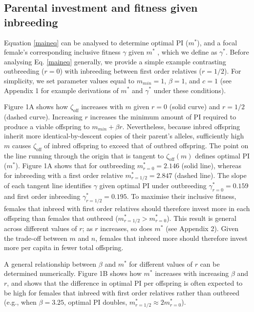\documentclass[12pt]{article}
\begin{document}
\subsection*{Parental investment and fitness given inbreeding}

Equation \ref{maineq} can be analysed to determine optimal PI ($m^{*}$), and a focal female's corresponding inclusive fitness $\gamma$ given $m^{*}$ \cite[][]{Kuijper2012}, which we define as $\gamma^{*}$. Before analysing Eq. \ref{maineq} generally, we provide a simple example contrasting outbreeding ($r=0$) with inbreeding between first order relatives ($r=1/2$). For simplicity, we set parameter values equal to $m_{min}=1$, $\beta=1$, and $c=1$ (see Appendix 1 for example derivations of $m^{*}$ and $\gamma^{*}$ under these conditions).

Figure 1A shows how $\zeta_{\textrm{off}}$ increases with $m$ given $r=0$ (solid curve) and $r=1/2$ (dashed curve). Increasing $r$ increases the minimum amount of PI required to produce a viable offspring to $m_{min}+\beta r$. Nevertheless, because inbred offspring inherit more identical-by-descent copies of their parent's alleles, sufficiently high $m$ causes $\zeta_{\textrm{off}}$ of inbred offspring to exceed that of outbred offspring. The point on the line running through the origin that is tangent to $\zeta_{\textrm{off}}(m)$ defines optimal PI ($m^{*}$). Figure 1A shows that for outbreeding $m^{*}_{r=0}=2.146$ (solid line), whereas for inbreeding with a first order relative $m^{*}_{r=1/2}=2.847$ (dashed line). The slope of each tangent line identifies $\gamma$ given optimal PI under outbreeding $\gamma^{*}_{r=0}=0.159$ and first order inbreeding $\gamma^{*}_{r=1/2}=0.195$. To maximise their inclusive fitness, females that inbreed with first order relatives should therefore invest more in each offspring than females that outbreed ($m^{*}_{r=1/2}>m^{*}_{r=0}$). This result is general across different values of $r$; as $r$ increases, so does $m^{*}$ (see Appendix 2). Given the trade-off between $m$ and $n$, females that inbreed more should therefore invest more per capita in fewer total offspring. 

A general relationship between $\beta$ and $m^{*}$ for different values of $r$ can be determined numerically. Figure 1B shows how $m^{*}$ increases with increasing $\beta$ and $r$, and shows that the difference in optimal PI per offspring is often expected to be high for females that inbreed with first order relatives rather than outbreed (e.g., when $\beta=3.25$, optimal PI doubles, $m^{*}_{r=1/2} \approx 2m^{*}_{r=0}$).
\end{document}
